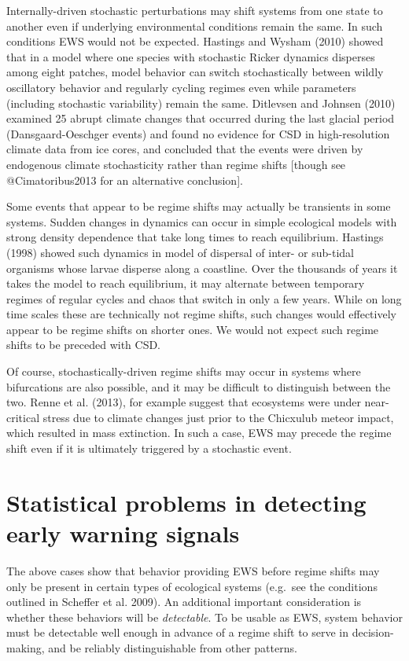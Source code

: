 \documentclass[author-year, review]{elsarticle} %
\begin{document}
Internally-driven stochastic perturbations may shift systems from one
state to another even if underlying environmental conditions remain the
same. In such conditions EWS would not be expected. Hastings and Wysham
(2010) showed that in a model where one species with stochastic Ricker
dynamics disperses among eight patches, model behavior can switch
stochastically between wildly oscillatory behavior and regularly cycling
regimes even while parameters (including stochastic variability) remain
the same. Ditlevsen and Johnsen (2010) examined 25 abrupt climate
changes that occurred during the last glacial period (Dansgaard-Oeschger
events) and found no evidence for CSD in high-resolution climate data
from ice cores, and concluded that the events were driven by endogenous
climate stochasticity rather than regime shifts {[}though see
@Cimatoribus2013 for an alternative conclusion{]}.

Some events that appear to be regime shifts may actually be transients
in some systems. Sudden changes in dynamics can occur in simple
ecological models with strong density dependence that take long times to
reach equilibrium. Hastings (1998) showed such dynamics in model of
dispersal of inter- or sub-tidal organisms whose larvae disperse along a
coastline. Over the thousands of years it takes the model to reach
equilibrium, it may alternate between temporary regimes of regular
cycles and chaos that switch in only a few years. While on long time
scales these are technically not regime shifts, such changes would
effectively appear to be regime shifts on shorter ones. We would not
expect such regime shifts to be preceded with CSD.

Of course, stochastically-driven regime shifts may occur in systems
where bifurcations are also possible, and it may be difficult to
distinguish between the two. Renne et al. (2013), for example suggest
that ecosystems were under near-critical stress due to climate changes
just prior to the Chicxulub meteor impact, which resulted in mass
extinction. In such a case, EWS may precede the regime shift even if it
is ultimately triggered by a stochastic event.

\section{Statistical problems in detecting early warning signals}

The above cases show that behavior providing EWS before regime shifts
may only be present in certain types of ecological systems (e.g.~see the
conditions outlined in Scheffer et al. 2009). An additional important
consideration is whether these behaviors will be \emph{detectable}. To
be usable as EWS, system behavior must be detectable well enough in
advance of a regime shift to serve in decision-making, and be reliably
distinguishable from other patterns.
\end{document}
